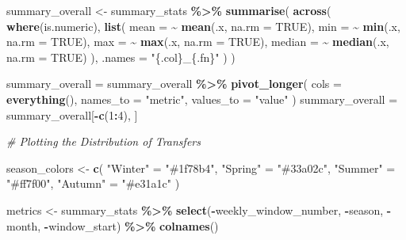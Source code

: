 \documentclass[
]{article}
\newenvironment{Shaded}{\begin{snugshade}}{\end{snugshade}}
\newcommand{\AttributeTok}[1]{\textcolor[rgb]{0.13,0.29,0.53}{#1}}
\newcommand{\CommentTok}[1]{\textcolor[rgb]{0.56,0.35,0.01}{\textit{#1}}}
\newcommand{\ConstantTok}[1]{\textcolor[rgb]{0.56,0.35,0.01}{#1}}
\newcommand{\DecValTok}[1]{\textcolor[rgb]{0.00,0.00,0.81}{#1}}
\newcommand{\FunctionTok}[1]{\textcolor[rgb]{0.13,0.29,0.53}{\textbf{#1}}}
\newcommand{\NormalTok}[1]{#1}
\newcommand{\OtherTok}[1]{\textcolor[rgb]{0.56,0.35,0.01}{#1}}
\newcommand{\SpecialCharTok}[1]{\textcolor[rgb]{0.81,0.36,0.00}{\textbf{#1}}}
\newcommand{\StringTok}[1]{\textcolor[rgb]{0.31,0.60,0.02}{#1}}
\begin{document}
\begin{Shaded}
\begin{Highlighting}[]
\NormalTok{summary\_overall }\OtherTok{\textless{}{-}}\NormalTok{ summary\_stats }\SpecialCharTok{\%\textgreater{}\%}
  \FunctionTok{summarise}\NormalTok{(}
    \FunctionTok{across}\NormalTok{(}
      \FunctionTok{where}\NormalTok{(is.numeric),}
      \FunctionTok{list}\NormalTok{(}
        \AttributeTok{mean =} \SpecialCharTok{\textasciitilde{}} \FunctionTok{mean}\NormalTok{(.x, }\AttributeTok{na.rm =} \ConstantTok{TRUE}\NormalTok{),}
        \AttributeTok{min =} \SpecialCharTok{\textasciitilde{}} \FunctionTok{min}\NormalTok{(.x, }\AttributeTok{na.rm =} \ConstantTok{TRUE}\NormalTok{),}
        \AttributeTok{max =} \SpecialCharTok{\textasciitilde{}} \FunctionTok{max}\NormalTok{(.x, }\AttributeTok{na.rm =} \ConstantTok{TRUE}\NormalTok{),}
        \AttributeTok{median =} \SpecialCharTok{\textasciitilde{}} \FunctionTok{median}\NormalTok{(.x, }\AttributeTok{na.rm =} \ConstantTok{TRUE}\NormalTok{)}
\NormalTok{      ),}
      \AttributeTok{.names =} \StringTok{"\{.col\}\_\{.fn\}"}
\NormalTok{    )}
\NormalTok{  )}

\NormalTok{summary\_overall }\OtherTok{=}\NormalTok{ summary\_overall }\SpecialCharTok{\%\textgreater{}\%} 
  \FunctionTok{pivot\_longer}\NormalTok{(}
    \AttributeTok{cols =} \FunctionTok{everything}\NormalTok{(),}
    \AttributeTok{names\_to =} \StringTok{"metric"}\NormalTok{, }
    \AttributeTok{values\_to =} \StringTok{"value"}
\NormalTok{  ) }
\NormalTok{summary\_overall }\OtherTok{=}\NormalTok{ summary\_overall[}\SpecialCharTok{{-}}\FunctionTok{c}\NormalTok{(}\DecValTok{1}\SpecialCharTok{:}\DecValTok{4}\NormalTok{), ]}


\CommentTok{\# Plotting the Distribution of Transfers}

\NormalTok{season\_colors }\OtherTok{\textless{}{-}} \FunctionTok{c}\NormalTok{(}
  \StringTok{"Winter"} \OtherTok{=} \StringTok{"\#1f78b4"}\NormalTok{,}
  \StringTok{"Spring"} \OtherTok{=} \StringTok{"\#33a02c"}\NormalTok{,}
  \StringTok{"Summer"} \OtherTok{=} \StringTok{"\#ff7f00"}\NormalTok{,}
  \StringTok{"Autumn"} \OtherTok{=} \StringTok{"\#e31a1c"}
\NormalTok{)}

\NormalTok{metrics }\OtherTok{\textless{}{-}}\NormalTok{ summary\_stats }\SpecialCharTok{\%\textgreater{}\%}
  \FunctionTok{select}\NormalTok{(}\SpecialCharTok{{-}}\NormalTok{weekly\_window\_number, }\SpecialCharTok{{-}}\NormalTok{season, }\SpecialCharTok{{-}}\NormalTok{month, }\SpecialCharTok{{-}}\NormalTok{window\_start) }\SpecialCharTok{\%\textgreater{}\%}
  \FunctionTok{colnames}\NormalTok{()}


\end{Highlighting}
\end{Shaded}
\end{document}
